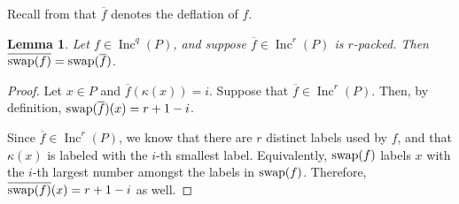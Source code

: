 \documentclass[11pt]{amsart}
\newtheorem{lemma}[theorem]{Lemma}
\theoremstyle{definition}
\DeclareMathOperator{\Inc}{\mathrm{Inc}}
\newcommand{\swap}{\textnormal{swap}}
\begin{document}
Recall from  that $\overline{f}$ denotes the deflation of $f$.

\begin{lemma}\label{lem:SwapAndDeflation}
Let $f \in \Inc^q(P)$, and suppose $\overline{f}\in\Inc^r(P)$ is $r$-packed.  Then $\overline{\swap(f)} = \swap(\overline{f})$.
\end{lemma}

\begin{proof}
Let $x \in P$ and $\overline{f}(\kappa(x)) = i$. Suppose that $\overline{f} \in \Inc^r(P)$. Then, by definition, $\swap(\overline{f})(x) = r+1-i$. 

Since $\overline{f} \in \Inc^r(P)$, we know that there are $r$ distinct labels used by $f$, and that $\kappa(x)$ is labeled with the $i$-th smallest label. Equivalently, $\swap(f)$ labels $x$  with the $i$-th largest number amongst the labels in $\swap(f)$. Therefore, $\overline{\swap(f)}(x) = r+1-i$ as well.
\end{proof}
\end{document}
